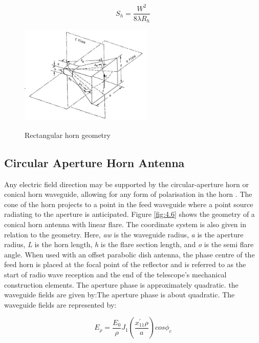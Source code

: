 {\begin{equation}
    S_h =  \frac{W^2}{8\lambda R_h} 
\end{equation}


\begin{figure}[htp]
 \centering
\includegraphics[width=2.5in]{Figures/rectangular_horn.jpg}
\caption{Rectangular horn geometry}
\label{fig:4.5}
\cite{schrank1989antenna}
\end{figure}



\subsection{Circular Aperture Horn Antenna}

Any electric field direction may be supported by the circular-aperture horn or conical horn waveguide, allowing for any form of polarisation in the horn \cite{milligan2005modern}. The cone of the horn projects to a point in the feed waveguide where a point source radiating to the aperture is anticipated. Figure \ref{fig:4.6} shows the geometry of a conical horn antenna with linear flare. The coordinate system is also given in relation to the geometry. Here, \textit{aw} is the waveguide radius, \textit{a} is the aperture radius, \textit{L} is the horn length, \textit{h} is the flare section length, and \textit{o} is the semi flare angle. When used with an offset parabolic dish antenna, the phase centre of the feed horn is placed at the focal point of the reflector and is referred to as the start of radio wave reception and the end of the telescope's mechanical construction elements. The aperture phase is approximately quadratic. the waveguide fields are given by:The aperture phase is about quadratic. The waveguide fields are represented by:


\begin{equation}
    E_{\rho} = \frac{E_0}{\rho}J_1 (\frac{x^{'}_{11} \rho}{a})cos\phi_c
\end{equation}



}
